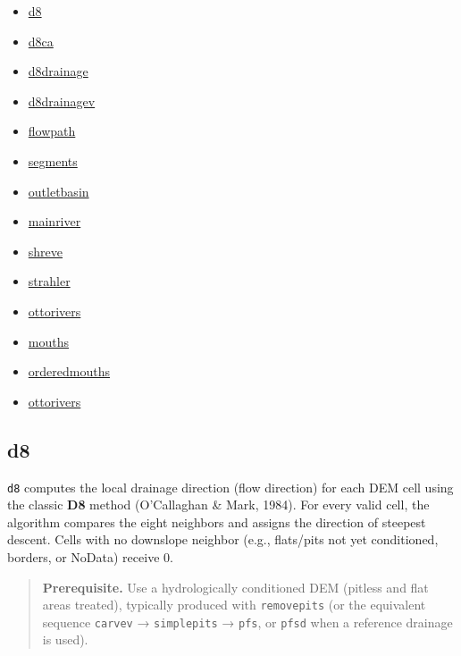 \documentclass[
]{book}
\providecommand{\tightlist}{%
  \setlength{\itemsep}{0pt}\setlength{\parskip}{0pt}}
\begin{document}
\begin{itemize}
\tightlist
\item
  \hyperref[d8]{d8}\\
\item
  \hyperref[d8ca]{d8ca}\\
\item
  \hyperref[d8drainage]{d8drainage}\\
\item
  \hyperref[d8drainagev]{d8drainagev}
\item
  \hyperref[flowpath]{flowpath}
\item
  \hyperref[segments]{segments}\\
\item
  \hyperref[outletbasin]{outletbasin}\\
\item
  \hyperref[mainriver]{mainriver}\\
\item
  \hyperref[shreve]{shreve}\\
\item
  \hyperref[strahler]{strahler}\\
\item
  \hyperref[ottorivers]{ottorivers}\\
\item
  \hyperref[mouths]{mouths}\\
\item
  \hyperref[orderedmouths]{orderedmouths}
\item
  \hyperref[ottorivers]{ottorivers}
\end{itemize}

\subsection{d8}\label{d8}

\texttt{d8} computes the local drainage direction (flow direction) for each DEM cell using the classic \textbf{D8} method (O'Callaghan \& Mark, 1984). For every valid cell, the algorithm compares the eight neighbors and assigns the direction of steepest descent. Cells with no downslope neighbor (e.g., flats/pits not yet conditioned, borders, or NoData) receive 0.

\begin{quote}
\textbf{Prerequisite.} Use a hydrologically conditioned DEM (pitless and flat areas treated), typically produced with \texttt{removepits} (or the equivalent sequence \texttt{carvev} → \texttt{simplepits} → \texttt{pfs}, or \texttt{pfsd} when a reference drainage is used).
\end{quote}
\end{document}
